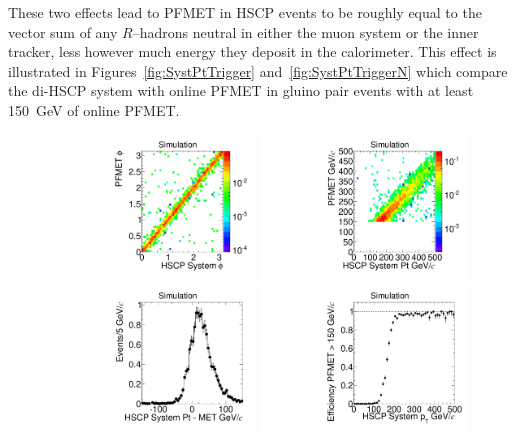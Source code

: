 These two effects lead to PFMET in HSCP events to be roughly equal to the vector sum of any $R$--hadrons neutral in
either the muon system or the inner tracker, less however much energy they deposit in the calorimeter. This effect is illustrated in Figures~\ref{fig:SystPtTrigger} 
and~\ref{fig:SystPtTriggerN} which compare the di-HSCP system with online PFMET in gluino pair events with at least 150~GeV of online PFMET.

\begin{figure}
  \begin{center}
      \includegraphics[clip=false, trim=0.0cm 0cm 0.0cm 0cm, width=0.49\textwidth]{figures/search/Gluino_8TeV_M1200_f100SystPhiMET}
      \includegraphics[clip=false, trim=0.0cm 0cm 0.0cm 0cm, width=0.49\textwidth]{figures/search/Gluino_8TeV_M1200_f100SystPtMET} \\
      \includegraphics[clip=false, trim=0.0cm 0cm 0.0cm 0cm, width=0.49\textwidth]{figures/search/Gluino_8TeV_M1200_f100SystPtDiffMET}
      \includegraphics[clip=false, trim=0.0cm 0cm 0.0cm 0cm, width=0.49\textwidth]{figures/search/Gluino_8TeV_M1200_f100SystPtEff}

\end{center}
\end{figure}
